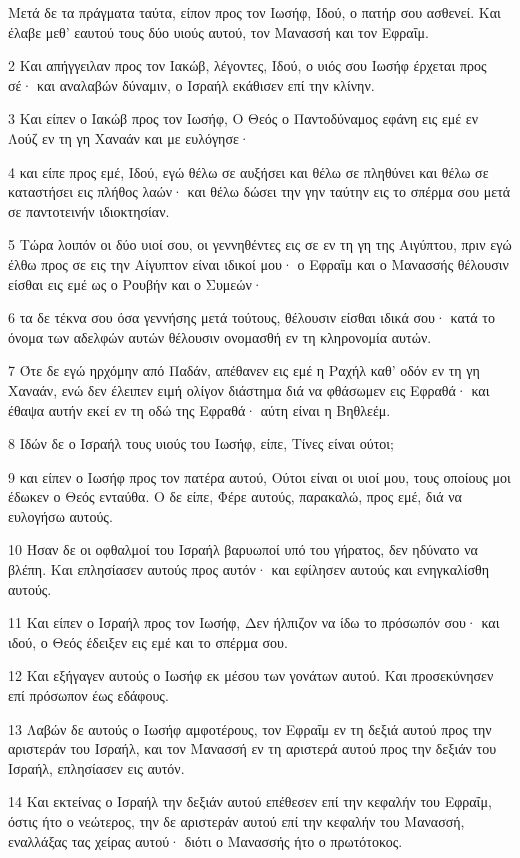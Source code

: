 \par Μετά δε τα πράγματα ταύτα, είπον προς τον Ιωσήφ, Ιδού, ο πατήρ σου ασθενεί. Και έλαβε μεθ' εαυτού τους δύο υιούς αυτού, τον Μανασσή και τον Εφραΐμ.
\par 2 Και απήγγειλαν προς τον Ιακώβ, λέγοντες, Ιδού, ο υιός σου Ιωσήφ έρχεται προς σέ· και αναλαβών δύναμιν, ο Ισραήλ εκάθισεν επί την κλίνην.
\par 3 Και είπεν ο Ιακώβ προς τον Ιωσήφ, Ο Θεός ο Παντοδύναμος εφάνη εις εμέ εν Λούζ εν τη γη Χαναάν και με ευλόγησε·
\par 4 και είπε προς εμέ, Ιδού, εγώ θέλω σε αυξήσει και θέλω σε πληθύνει και θέλω σε καταστήσει εις πλήθος λαών· και θέλω δώσει την γην ταύτην εις το σπέρμα σου μετά σε παντοτεινήν ιδιοκτησίαν.
\par 5 Τώρα λοιπόν οι δύο υιοί σου, οι γεννηθέντες εις σε εν τη γη της Αιγύπτου, πριν εγώ έλθω προς σε εις την Αίγυπτον είναι ιδικοί μου· ο Εφραΐμ και ο Μανασσής θέλουσιν είσθαι εις εμέ ως ο Ρουβήν και ο Συμεών·
\par 6 τα δε τέκνα σου όσα γεννήσης μετά τούτους, θέλουσιν είσθαι ιδικά σου· κατά το όνομα των αδελφών αυτών θέλουσιν ονομασθή εν τη κληρονομία αυτών.
\par 7 Ότε δε εγώ ηρχόμην από Παδάν, απέθανεν εις εμέ η Ραχήλ καθ' οδόν εν τη γη Χαναάν, ενώ δεν έλειπεν ειμή ολίγον διάστημα διά να φθάσωμεν εις Εφραθά· και έθαψα αυτήν εκεί εν τη οδώ της Εφραθά· αύτη είναι η Βηθλεέμ.
\par 8 Ιδών δε ο Ισραήλ τους υιούς του Ιωσήφ, είπε, Τίνες είναι ούτοι;
\par 9 και είπεν ο Ιωσήφ προς τον πατέρα αυτού, Ούτοι είναι οι υιοί μου, τους οποίους μοι έδωκεν ο Θεός ενταύθα. Ο δε είπε, Φέρε αυτούς, παρακαλώ, προς εμέ, διά να ευλογήσω αυτούς.
\par 10 Ήσαν δε οι οφθαλμοί του Ισραήλ βαρυωποί υπό του γήρατος, δεν ηδύνατο να βλέπη. Και επλησίασεν αυτούς προς αυτόν· και εφίλησεν αυτούς και ενηγκαλίσθη αυτούς.
\par 11 Και είπεν ο Ισραήλ προς τον Ιωσήφ, Δεν ήλπιζον να ίδω το πρόσωπόν σου· και ιδού, ο Θεός έδειξεν εις εμέ και το σπέρμα σου.
\par 12 Και εξήγαγεν αυτούς ο Ιωσήφ εκ μέσου των γονάτων αυτού. Και προσεκύνησεν επί πρόσωπον έως εδάφους.
\par 13 Λαβών δε αυτούς ο Ιωσήφ αμφοτέρους, τον Εφραΐμ εν τη δεξιά αυτού προς την αριστεράν του Ισραήλ, και τον Μανασσή εν τη αριστερά αυτού προς την δεξιάν του Ισραήλ, επλησίασεν εις αυτόν.
\par 14 Και εκτείνας ο Ισραήλ την δεξιάν αυτού επέθεσεν επί την κεφαλήν του Εφραΐμ, όστις ήτο ο νεώτερος, την δε αριστεράν αυτού επί την κεφαλήν του Μανασσή, εναλλάξας τας χείρας αυτού· διότι ο Μανασσής ήτο ο πρωτότοκος.
